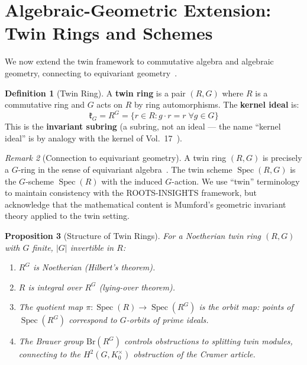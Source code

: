 \documentclass[11pt,twocolumn]{article}
\theoremstyle{plain}\newtheorem{theorem}{Theorem}\newtheorem{proposition}[theorem]{Proposition}\newtheorem{corollary}[theorem]{Corollary}\newtheorem{lemma}[theorem]{Lemma}
\theoremstyle{definition}\newtheorem{definition}[theorem]{Definition}\newtheorem{example}[theorem]{Example}
\theoremstyle{remark}\newtheorem{remark}[theorem]{Remark}
\newcommand{\Spec}{\operatorname{Spec}}
\begin{document}
\section{Algebraic-Geometric Extension: Twin Rings and Schemes}
\label{sec:ag}

We now extend the twin framework to commutative algebra and algebraic geometry, connecting to equivariant geometry~\cite{mumford1965,thomason1987}.

\begin{definition}[Twin Ring]\label{def:twin-ring}
A \textbf{twin ring} is a pair $(R, G)$ where $R$ is a commutative ring and $G$ acts on $R$ by ring automorphisms. The \textbf{kernel ideal} is:
\begin{equation}
\mathfrak{k}_G = R^G = \{r \in R : g \cdot r = r \;\forall g \in G\}
\end{equation}
This is the \textbf{invariant subring} (a subring, not an ideal --- the name ``kernel ideal'' is by analogy with the kernel of Vol.~17~\cite{nembe2026vol17}).
\end{definition}

\begin{remark}[Connection to equivariant geometry]
A twin ring $(R, G)$ is precisely a $G$-ring in the sense of equivariant algebra~\cite{mumford1965}. The twin scheme $\Spec(R, G)$ is the $G$-scheme $\Spec(R)$ with the induced $G$-action. We use ``twin'' terminology to maintain consistency with the ROOTS-INSIGHTS framework, but acknowledge that the mathematical content is Mumford's geometric invariant theory applied to the twin setting.
\end{remark}

\begin{proposition}[Structure of Twin Rings]\label{prop:twin-ring-structure}
For a Noetherian twin ring $(R, G)$ with $G$ finite, $|G|$ invertible in $R$:
\begin{enumerate}[label=(\alph*)]
    \item $R^G$ is Noetherian (Hilbert's theorem).
    \item $R$ is integral over $R^G$ (lying-over theorem).
    \item The quotient map $\pi: \Spec(R) \to \Spec(R^G)$ is the orbit map: points of $\Spec(R^G)$ correspond to $G$-orbits of prime ideals.
    \item The Brauer group $\mathrm{Br}(R^G)$ controls obstructions to splitting twin modules, connecting to the $H^2(G, K_0^\times)$ obstruction of the Cramer article.
\end{enumerate}
\end{proposition}
\end{document}
